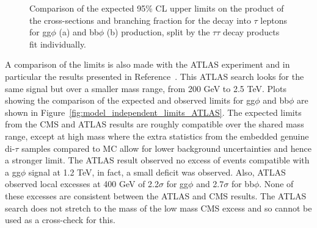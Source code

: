 \begin{figure}[!hbtp]
\centering
\caption[Plots of the expected model-independent limits split by the $\tau\tau$ decay channels.]{Comparison of the expected 95\% CL upper limits on the product of the cross-sections and branching fraction for the decay into $\tau$ leptons for gg$\phi$ (a) and bb$\phi$ (b) production, split by the $\tau\tau$ decay products fit individually.}
\label{fig:model_independent_limits_by_channel}
\end{figure}

A comparison of the limits is also made with the ATLAS experiment and in particular the results presented in Reference~\cite{ATLAS:2020zms}.
This ATLAS search looks for the same signal but over a smaller mass range, from 200 GeV to 2.5 TeV.
Plots showing the comparison of the expected and observed limits for gg$\phi$ and bb$\phi$ are shown in Figure~\ref{fig:model_independent_limits_ATLAS}.
The expected limits from the \ac{CMS} and ATLAS results are roughly compatible over the shared mass range, except at high mass where the extra statistics from the embedded genuine di-$\tau$ samples compared to \ac{MC} allow for lower background uncertainties and hence a stronger limit.
The ATLAS result observed no excess of events compatible with a gg$\phi$ signal at 1.2 TeV, in fact, a small deficit was observed.
Also, ATLAS observed local excesses at 400 GeV of 2.2$\sigma$ for gg$\phi$ and 2.7$\sigma$ for bb$\phi$.
None of these excesses are consistent between the ATLAS and \ac{CMS} results.
The ATLAS search does not stretch to the mass of the low mass \ac{CMS} excess and so cannot be used as a cross-check for this.

